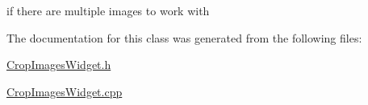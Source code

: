 if there are multiple images to work with 



The documentation for this class was generated from the following files\-:\begin{DoxyCompactItemize}
\item 
\hyperlink{_crop_images_widget_8h}{Crop\-Images\-Widget.\-h}\item 
\hyperlink{_crop_images_widget_8cpp}{Crop\-Images\-Widget.\-cpp}\end{DoxyCompactItemize}
